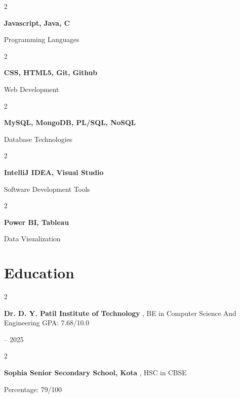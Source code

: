 \documentclass[10pt, letterpaper]{article}
\newenvironment{twocolentry}[2][]{
    \onecolentry
    \def\secondColumn{#2}
    \setcolumnwidth{\fill, 4.5 cm}
    \begin{paracol}{2}
}{
    \switchcolumn \raggedleft \secondColumn
    \end{paracol}
    \endonecolentry
} %
\begin{document}
        
        \begin{samepage}
    \begin{twocolentry}{
        Programming Languages
    }
        \textbf{Javascript, Java, C}
    \end{twocolentry}
    
    \vspace{0.10 cm}
    
    \begin{twocolentry}{
        Web Development
    }
        \textbf{CSS, HTML5, Git, Github}
    \end{twocolentry}
    
    \vspace{0.10 cm}
    
    \begin{twocolentry}{
        Database Technologies
    }
        \textbf{MySQL, MongoDB, PL/SQL, NoSQL}
    \end{twocolentry}
    
    \vspace{0.10 cm}
    
    \begin{twocolentry}{
        Software Development Tools
    }
        \textbf{IntelliJ IDEA, Visual Studio}
    \end{twocolentry}
    
    \vspace{0.10 cm}
    
    \begin{twocolentry}{
        Data Visualization
    }
        \textbf{Power BI, Tableau}
    \end{twocolentry}
\end{samepage}





    \section{Education}



        
        \begin{twocolentry}{
            2021 – 2025
        }
            \textbf{Dr. D. Y. Patil Institute of Technology  }, BE in Computer Science And Engineering
            GPA: 7.68/10.0
            \end{twocolentry}

           \begin{twocolentry}{
            2020
        }
            \textbf{Sophia Senior Secondary School, Kota    }, HSC in CBSE 
            
            Percentage: 79/100
            \end{twocolentry}
               
\end{document}
